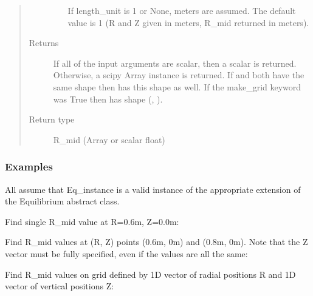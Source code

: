 \documentclass[letterpaper,10pt,english]{sphinxmanual}
\begin{document}
\begin{fulllineitems}
\begin{fulllineitems}
\begin{quote}
\begin{description}
\begin{itemize}
If length\_unit is 1 or None, meters are assumed. The default
value is 1 (R and Z given in meters, R\_mid returned in meters).


\end{itemize}

\item[{Returns}] \leavevmode
If all of the input arguments are
scalar, then a scalar is returned. Otherwise, a scipy Array
instance is returned. If  and  both have the same shape
then  has this shape as well. If the make\_grid keyword
was True then  has shape (, ).

\item[{Return type}] \leavevmode
R\_mid (Array or scalar float)

\end{description}\end{quote}
\subsubsection*{Examples}

All assume that Eq\_instance is a valid instance of the appropriate
extension of the Equilibrium abstract class.

Find single R\_mid value at R=0.6m, Z=0.0m:

\begin{sphinxVerbatim}[commandchars=\\\{\}]
   
\end{sphinxVerbatim}

Find R\_mid values at (R, Z) points (0.6m, 0m) and (0.8m, 0m).
Note that the Z vector must be fully specified,
even if the values are all the same:

\begin{sphinxVerbatim}[commandchars=\\\{\}]
  \PYG{p}{[} \PYG{p}{]} \PYG{p}{[} \PYG{p}{]}
\end{sphinxVerbatim}

Find R\_mid values on grid defined by 1D vector of radial positions R
and 1D vector of vertical positions Z:


\end{fulllineitems}
\end{fulllineitems}
\end{document}

